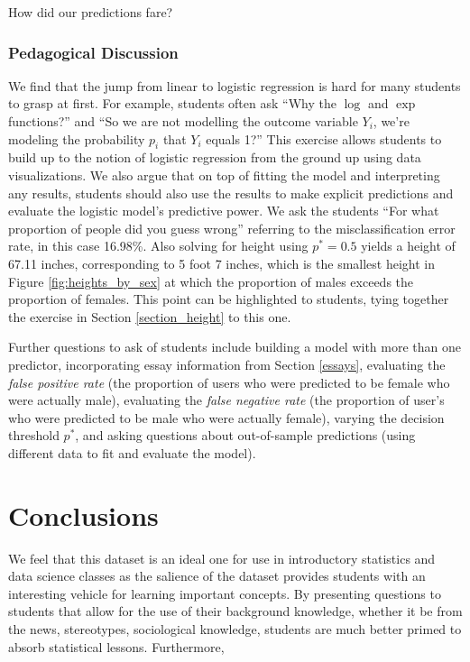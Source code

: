 \documentclass{article}\usepackage[]{graphicx}\usepackage[]{color}
\begin{document}
How did our predictions fare?

\subsubsection{Pedagogical Discussion}
We find that the jump from linear to logistic regression is hard for many students to grasp at first.  For example, students often ask ``Why the $\log$ and $\exp$ functions?'' and ``So we are not modelling the outcome variable $Y_i$, we're modeling the probability $p_i$ that $Y_i$ equals 1?''  This exercise allows students to build up to the notion of logistic regression from the ground up using data visualizations.  We also argue that on top of fitting the model and interpreting any results, students should also use the results to make explicit predictions and evaluate the logistic model's predictive power.  We ask the students ``For what proportion of people did you guess wrong'' referring to the misclassification error rate, in this case 16.98\%.  Also solving for height using $p^*=0.5$ yields a height of 67.11 inches, corresponding to 5 foot 7 inches, which is the smallest height in Figure \ref{fig:heights_by_sex} at which the proportion of males exceeds the proportion of females.  This point can be highlighted to students, tying together the exercise in Section \ref{section_height} to this one.

Further questions to ask of students include building a model with more than one predictor, incorporating essay information from Section \ref{essays}, evaluating the \textit{false positive rate} (the proportion of users who were predicted to be female who were actually male), evaluating the \textit{false negative rate} (the proportion of user's who were predicted to be male who were actually female), varying the decision threshold $p^*$, and asking questions about out-of-sample predictions (using different data to fit and evaluate the model).












%
\section{Conclusions}
%
We feel that this dataset is an ideal one for use in introductory statistics and data science classes as the salience of the dataset provides students with an interesting vehicle for learning important concepts.  By presenting questions to students that allow for the use of their background knowledge, whether it be from the news, stereotypes, sociological knowledge, students are much better primed to absorb statistical lessons.  Furthermore,
\end{document}
